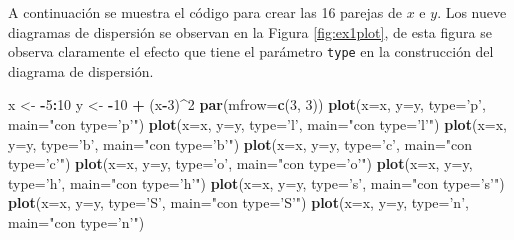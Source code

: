 \documentclass[10pt,]{krantz}
\makeatletter
\newenvironment{Shaded}{\begin{snugshade}}{\end{snugshade}}
\newcommand{\KeywordTok}[1]{\textcolor[rgb]{0.13,0.29,0.53}{\textbf{#1}}}
\newcommand{\DataTypeTok}[1]{\textcolor[rgb]{0.13,0.29,0.53}{#1}}
\newcommand{\DecValTok}[1]{\textcolor[rgb]{0.00,0.00,0.81}{#1}}
\newcommand{\StringTok}[1]{\textcolor[rgb]{0.31,0.60,0.02}{#1}}
\newcommand{\OperatorTok}[1]{\textcolor[rgb]{0.81,0.36,0.00}{\textbf{#1}}}
\newcommand{\NormalTok}[1]{#1}
\newenvironment{kframe}{%
\medskip{}
\setlength{\fboxsep}{.8em}
 \def\at@end@of@kframe{}%
 \ifinner\ifhmode%
  \def\at@end@of@kframe{\end{minipage}}%
  \begin{minipage}{\columnwidth}%
 \fi\fi%
 \def\FrameCommand##1{\hskip\@totalleftmargin \hskip-\fboxsep
 \colorbox{shadecolor}{##1}\hskip-\fboxsep
     \hskip-\linewidth \hskip-\@totalleftmargin \hskip\columnwidth}%
 \MakeFramed {\advance\hsize-\width
   \@totalleftmargin\z@ \linewidth\hsize
   \@setminipage}}%
 {\par\unskip\endMakeFramed%
 \at@end@of@kframe}
\renewenvironment{Shaded}{\begin{kframe}}{\end{kframe}}
\makeatother
\begin{document}
A continuación se muestra el código para crear las 16 parejas de \(x\) e
\(y\). Los nueve diagramas de dispersión se observan en la Figura
\ref{fig:ex1plot}, de esta figura se observa claramente el efecto que
tiene el parámetro \texttt{type} en la construcción del diagrama de
dispersión.

\begin{Shaded}
\begin{Highlighting}[]
\NormalTok{x <-}\StringTok{ }\OperatorTok{-}\DecValTok{5}\OperatorTok{:}\DecValTok{10}
\NormalTok{y <-}\StringTok{ }\OperatorTok{-}\DecValTok{10} \OperatorTok{+}\StringTok{ }\NormalTok{(x}\OperatorTok{-}\DecValTok{3}\NormalTok{)}\OperatorTok{^}\DecValTok{2}
\KeywordTok{par}\NormalTok{(}\DataTypeTok{mfrow=}\KeywordTok{c}\NormalTok{(}\DecValTok{3}\NormalTok{, }\DecValTok{3}\NormalTok{))}
\KeywordTok{plot}\NormalTok{(}\DataTypeTok{x=}\NormalTok{x, }\DataTypeTok{y=}\NormalTok{y, }\DataTypeTok{type=}\StringTok{'p'}\NormalTok{, }\DataTypeTok{main=}\StringTok{"con type='p'"}\NormalTok{)}
\KeywordTok{plot}\NormalTok{(}\DataTypeTok{x=}\NormalTok{x, }\DataTypeTok{y=}\NormalTok{y, }\DataTypeTok{type=}\StringTok{'l'}\NormalTok{, }\DataTypeTok{main=}\StringTok{"con type='l'"}\NormalTok{)}
\KeywordTok{plot}\NormalTok{(}\DataTypeTok{x=}\NormalTok{x, }\DataTypeTok{y=}\NormalTok{y, }\DataTypeTok{type=}\StringTok{'b'}\NormalTok{, }\DataTypeTok{main=}\StringTok{"con type='b'"}\NormalTok{)}
\KeywordTok{plot}\NormalTok{(}\DataTypeTok{x=}\NormalTok{x, }\DataTypeTok{y=}\NormalTok{y, }\DataTypeTok{type=}\StringTok{'c'}\NormalTok{, }\DataTypeTok{main=}\StringTok{"con type='c'"}\NormalTok{)}
\KeywordTok{plot}\NormalTok{(}\DataTypeTok{x=}\NormalTok{x, }\DataTypeTok{y=}\NormalTok{y, }\DataTypeTok{type=}\StringTok{'o'}\NormalTok{, }\DataTypeTok{main=}\StringTok{"con type='o'"}\NormalTok{)}
\KeywordTok{plot}\NormalTok{(}\DataTypeTok{x=}\NormalTok{x, }\DataTypeTok{y=}\NormalTok{y, }\DataTypeTok{type=}\StringTok{'h'}\NormalTok{, }\DataTypeTok{main=}\StringTok{"con type='h'"}\NormalTok{)}
\KeywordTok{plot}\NormalTok{(}\DataTypeTok{x=}\NormalTok{x, }\DataTypeTok{y=}\NormalTok{y, }\DataTypeTok{type=}\StringTok{'s'}\NormalTok{, }\DataTypeTok{main=}\StringTok{"con type='s'"}\NormalTok{)}
\KeywordTok{plot}\NormalTok{(}\DataTypeTok{x=}\NormalTok{x, }\DataTypeTok{y=}\NormalTok{y, }\DataTypeTok{type=}\StringTok{'S'}\NormalTok{, }\DataTypeTok{main=}\StringTok{"con type='S'"}\NormalTok{)}
\KeywordTok{plot}\NormalTok{(}\DataTypeTok{x=}\NormalTok{x, }\DataTypeTok{y=}\NormalTok{y, }\DataTypeTok{type=}\StringTok{'n'}\NormalTok{, }\DataTypeTok{main=}\StringTok{"con type='n'"}\NormalTok{)}
\end{Highlighting}
\end{Shaded}
\end{document}
